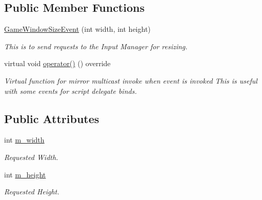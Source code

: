 \subsection*{Public Member Functions}
\begin{DoxyCompactItemize}
\item 
\hyperlink{classGameWindowSizeEvent_a4f0c1af7b0f5aeec006d10a1232f962d}{Game\+Window\+Size\+Event} (int width, int height)
\begin{DoxyCompactList}\small\item\em This is to send requests to the Input Manager for resizing. \end{DoxyCompactList}\item 
\mbox{\label{classGameWindowSizeEvent_ab39ad0a3b0698fae9d10fc417979a8e7}} 
virtual void \hyperlink{classGameWindowSizeEvent_ab39ad0a3b0698fae9d10fc417979a8e7}{operator()} () override
\begin{DoxyCompactList}\small\item\em Virtual function for mirror multicast invoke when event is invoked This is useful with some events for script delegate binds. \end{DoxyCompactList}\end{DoxyCompactItemize}
\subsection*{Public Attributes}
\begin{DoxyCompactItemize}
\item 
\mbox{\label{classGameWindowSizeEvent_a6c1d117f4404111b6412babe7a507645}} 
int \hyperlink{classGameWindowSizeEvent_a6c1d117f4404111b6412babe7a507645}{m\+\_\+width}
\begin{DoxyCompactList}\small\item\em Requested Width. \end{DoxyCompactList}\item 
\mbox{\label{classGameWindowSizeEvent_a945841f666144a3d6f755acaba3f9256}} 
int \hyperlink{classGameWindowSizeEvent_a945841f666144a3d6f755acaba3f9256}{m\+\_\+height}
\begin{DoxyCompactList}\small\item\em Requested Height. \end{DoxyCompactList}\end{DoxyCompactItemize}
